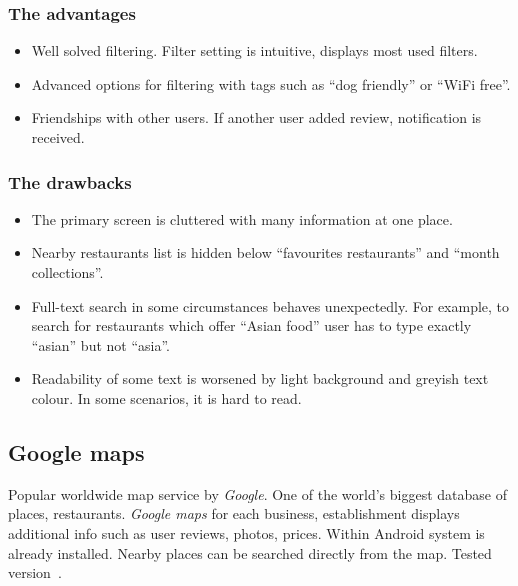 \subsubsection{The advantages}
\begin{itemize}
    \item Well solved filtering. Filter setting is intuitive, displays most used filters. 
    \item Advanced options for filtering with tags such as ``dog friendly'' or ``WiFi free''.
    \item Friendships with other users. If another user added review, notification is received.
\end{itemize}

\subsubsection{The drawbacks}
\begin{itemize}
    \item The primary screen is cluttered with many information at one place.
    \item Nearby restaurants list is hidden below ``favourites restaurants'' and ``month collections''.
    \item Full-text search in some circumstances behaves unexpectedly. For example, to search for restaurants which offer ``Asian food'' user has to type exactly ``asian'' but not ``asia''.
    \item Readability of some text is worsened by light background and greyish text colour. In some scenarios, it is hard to read.
\end{itemize}

\subsection{Google maps}
Popular worldwide map service by \textit{Google}. One of the world's biggest database of places, restaurants. 
\textit{Google maps} for each business, establishment displays additional info such as user reviews, photos, prices. 
Within Android system is already installed. Nearby places can be searched directly from the map. Tested version~\cite{app-google-maps}.

